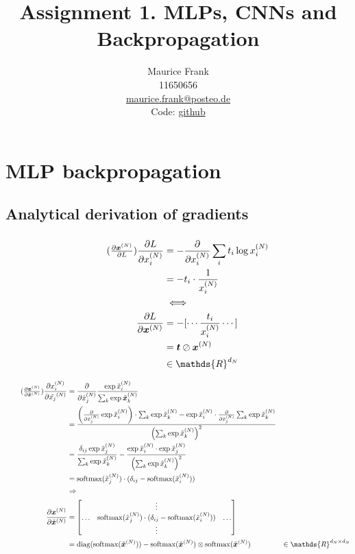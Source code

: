 \documentclass{article}
\title{Assignment 1. MLPs, CNNs and Backpropagation}
\author{%
  Maurice Frank\\
  11650656\\
  \href{mailto:maurice.frank@posteo.de}{maurice.frank@posteo.de} \\
  Code: \href{https://github.com/morris-frank/uvadlc_practicals_2019/tree/master/assignment_1/code}{github}
}
\newcommand\bM[1]{\ensuremath{\begin{bmatrix}#1\end{bmatrix}}}
\newcommand\·{\ensuremath{\cdot}}
\newcommand\…{\ensuremath{\dots}}
\renewcommand\t{\ensuremath{\times}}
\DeclareMathOperator{\soft}{softmax}
\DeclareMathOperator{\diag}{diag}
\newcommand{\⇔}{\ensuremath{\iff}}
\newcommand{\⇐}{\ensuremath{\impliedby}}
\newcommand{\⇒}{\ensuremath{\implies}}
\newcommand\f[2]{\ensuremath{\frac{#1}{#2}}}
\newcommand\pf[2]{\ensuremath{\frac{\partial {#1}}{\partial {#2}}}}
\newcommand*{\B}[1]{\ifmmode\bm{#1}\else\textbf{#1}\fi}
\newcommand\1{\ensuremath{\mathds{1}}}
\newcommand\ℝ{\ensuremath{\mathds{R}}}
\begin{document}
\maketitle
\section{MLP backpropagation}
\subsection{Analytical derivation of gradients}
\subsubsection{}
\begin{align*}
  \tag{$\pf{\B{x}^{(N)}}{L}$}
  \pf{L}{x_i^{(N)}}
  &= -\pf{}{x_i^{(N)}}\sum_i t_i \log x_i^{(N)}\\
  &= -t_i\·\f{1}{x_i^{(N)}}\\
  &\⇔\\
  \pf{L}{\B{x}^{(N)}}
  &= -[\dotsb \f{t_i}{x_i^{(N)}}\dotsb]\\
  &= \B{t}\oslash\B{x}^{(N)}\\
  &\in\ℝ^{d_N}
\end{align*}

\begin{align*}
  \tag{$\pf{\B{x}^{(N)}}{\tilde{\B{x}}^{(N)}}$}
  \pf{x_i^{(N)}}{\tilde{x_j}^{(N)}}
  &= \pf{}{\tilde{x}_j^{(N)}}\f{\exp{\tilde{x}_i^{(N)}}}{\sum_k \exp{\tilde{\B{x}}_k^{(N)}}}\\
  &= \f{\left(\pf{}{\tilde{x}^{(N)}_j}\exp{\tilde{x}^{(N)}_i}\right)\·\sum_k\exp{\tilde{x}^{(N)}_k} - \exp{\tilde{x}^{(N)}_i}\·\pf{}{\tilde{x}^{(N)}_j}\sum_k\exp{\tilde{x}^{(N)}_k}}{\left(\sum_k\exp{\tilde{x}^{(N)}_k}\right)^2}\\
  &= \f{\delta_{ij}\exp{\tilde{x}^{(N)}_j}}{\sum_k\exp{\tilde{x}^{(N)}_k}} - \f{\exp{\tilde{x}^{(N)}_i}\·\exp{\tilde{x}^{(N)}_j}}{\left(\sum_k\exp{\tilde{x}^{(N)}_k}\right)^2}\\
  &= \soft(\tilde{x}^{(N)}_j)\·(\delta_{ij} - \soft(\tilde{x}^{(N)}_i))\\
  &\Rightarrow\\
  \pf{\B{x}^{(N)}}{\tilde{\B{x}}^{(N)}} &= \bM{& \vdots &\\\hdots & \soft(\tilde{x}^{(N)}_j)\·(\delta_{ij} - \soft(\tilde{x}^{(N)}_i)) & \hdots\\ & \vdots &}\\
  &= \diag(\soft(\tilde{\B{x}}^{(N)})) -\soft(\tilde{\B{x}}^{(N)})\otimes \soft(\tilde{\B{x}}^{(N)})
  &\in\ℝ^{d_N\t d_N}
\end{align*}
\end{document}
